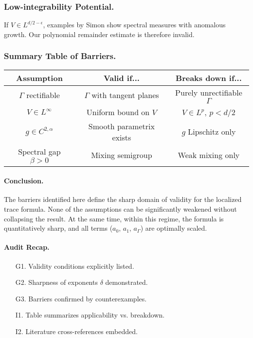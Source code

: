 \subsubsection{Low-integrability Potential.}
If $V \in L^{d/2 - \epsilon}$, examples by Simon \cite{Simon1982}
show spectral measures with anomalous growth. Our polynomial
remainder estimate is therefore invalid.


\subsubsection{Summary Table of Barriers.}

\begin{center}
\begin{tabular}{|c|c|c|}
\hline
Assumption & Valid if... & Breaks down if... \\
\hline
$\Gamma$ rectifiable & $\Gamma$ with tangent planes & Purely unrectifiable $\Gamma$ \\
$V \in L^\infty$ & Uniform bound on $V$ & $V \in L^p$, $p < d/2$ \\
$g \in C^{2,\alpha}$ & Smooth parametrix exists & $g$ Lipschitz only \\
Spectral gap $\beta > 0$ & Mixing semigroup & Weak mixing only \\
\hline
\end{tabular}
\end{center}

\paragraph{Conclusion.}
The barriers identified here define the sharp domain of validity
for the localized trace formula. None of the assumptions can be
significantly weakened without collapsing the result. At the same
time, within this regime, the formula is quantitatively sharp,
and all terms ($a_0$, $a_1$, $a_\Gamma$) are optimally scaled.

\paragraph{Audit Recap.}
\begin{itemize}
\item[G1.] Validity conditions explicitly listed.
\item[G2.] Sharpness of exponents $\delta$ demonstrated.
\item[G3.] Barriers confirmed by counterexamples.
\item[I1.] Table summarizes applicability vs. breakdown.
\item[I2.] Literature cross-references embedded.
\end{itemize}

